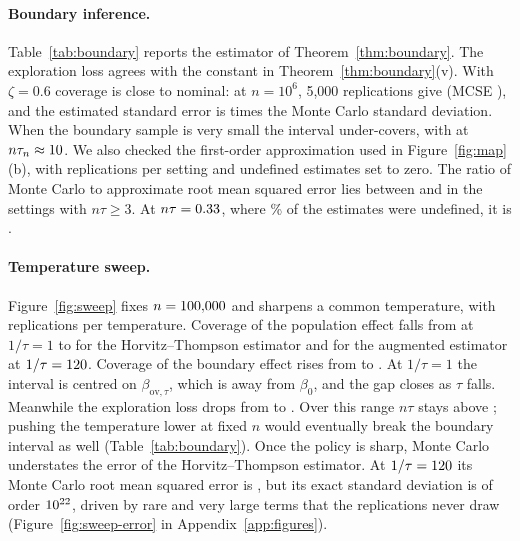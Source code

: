 \documentclass[12pt]{article}
\theoremstyle{definition}
\theoremstyle{remark}
\newcommand{\ov}{\mathrm{ov}}
\begin{document}
\paragraph{Boundary inference.} Table~\ref{tab:boundary} reports the estimator of
Theorem~\ref{thm:boundary}. The exploration loss agrees with the constant in
Theorem~\ref{thm:boundary}(v). With $\zeta=0.6$ coverage is close to nominal: at
$n=10^6$, 5,000 replications give \covFiveK{} (MCSE \covFiveKmcse), and the estimated
standard error is \covFiveKseRatio{} times the Monte Carlo standard deviation. When
the boundary sample is very small the interval under-covers, with \covSmallNtau{} at
$n\tau_n\approx10$. We also checked the first-order approximation used in
Figure~\ref{fig:map}(b), with \foReps{} replications per setting and undefined
estimates set to zero. The ratio of Monte Carlo to approximate root mean squared error
lies between \foRatioMin{} and \foRatioMax{} in the \foCells{} settings with
$n\tau\ge3$. At $n\tau=0.33$, where \foUndefPct\% of the estimates were
undefined, it is \foRatioTiny{}.

\begin{table}[tbp]
\centering\small
\tabBoundary
\caption{Boundary inference under common temperature $\tau_n=n^{-\zeta}$. Coverage
is of $\beta_0=c(0)$. Loss is the Monte Carlo mean with the
Theorem~\ref{thm:boundary}(v) constant in parentheses. The last row is a separate
5,000-replication run.}
\label{tab:boundary}
\end{table}

\paragraph{Temperature sweep.} Figure~\ref{fig:sweep} fixes $n=100{,}000$ and sharpens
a common temperature, with \curveReps{} replications per temperature. Coverage of the
population effect falls from \curvePopCovLo{} at $1/\tau=1$ to \curvePopCovHi{} for
the Horvitz--Thompson estimator and \curveAipwCovHi{} for the augmented estimator at
$1/\tau=120$. Coverage of the boundary effect rises from \curveBndCovLo{}
to \curveBndCovHi{}. At $1/\tau=1$ the interval is centred on $\beta_{\ov,\tau}$, which
is \curveBndBiasLo{} away from $\beta_0$, and the gap closes as $\tau$ falls. Meanwhile
the exploration loss drops from \curveLossLo{} to \curveLossHi{}. Over this range
$n\tau$ stays above \curveNtauMin{}; pushing the temperature lower at fixed $n$ would
eventually break the boundary interval as well (Table~\ref{tab:boundary}). Once the
policy is sharp, Monte Carlo understates the error of the Horvitz--Thompson estimator.
At $1/\tau=120$ its Monte Carlo root mean squared error is
\curveHtMcRmseHi{}, but its exact standard deviation is of order
$10^{22}$, driven by rare and very large terms that the replications
never draw (Figure~\ref{fig:sweep-error} in Appendix~\ref{app:figures}).
\end{document}
